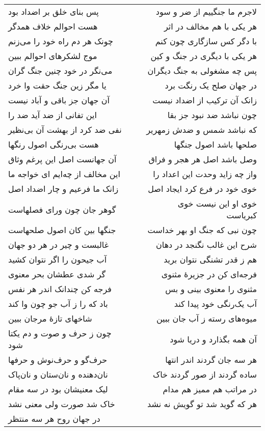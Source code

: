 \begin{center}
\begin{longtable}{l p{0.5cm} r}
پس بنای خلق بر اضداد بود
&&
لاجرم ما جنگییم از ضر و سود
\\
هست احوالم خلاف همدگر
&&
هر یکی با هم مخالف در اثر
\\
چونک هر دم راه خود را می‌زنم
&&
با دگر کس سازگاری چون کنم
\\
موج لشکرهای احوالم ببین
&&
هر یکی با دیگری در جنگ و کین
\\
می‌نگر در خود چنین جنگ گران
&&
پس چه مشغولی به جنگ دیگران
\\
یا مگر زین جنگ حقت وا خرد
&&
در جهان صلح یک رنگت برد
\\
آن جهان جز باقی و آباد نیست
&&
زانک آن ترکیب از اضداد نیست
\\
این تفانی از ضد آید ضد را
&&
چون نباشد ضد نبود جز بقا
\\
نفی ضد کرد از بهشت آن بی‌نظیر
&&
که نباشد شمس و ضدش زمهریر
\\
هست بی‌رنگی اصول رنگها
&&
صلحها باشد اصول جنگها
\\
آن جهانست اصل این پرغم وثاق
&&
وصل باشد اصل هر هجر و فراق
\\
این مخالف از چه‌ایم ای خواجه ما
&&
واز چه زاید وحدت این اعداد را
\\
زانک ما فرعیم و چار اضداد اصل
&&
خوی خود در فرع کرد ایجاد اصل
\\
گوهر جان چون ورای فصلهاست
&&
خوی او این نیست خوی کبریاست
\\
جنگها بین کان اصول صلحهاست
&&
چون نبی که جنگ او بهر خداست
\\
غالبست و چیر در هر دو جهان
&&
شرح این غالب نگنجد در دهان
\\
آب جیحون را اگر نتوان کشید
&&
هم ز قدر تشنگی نتوان برید
\\
گر شدی عطشان بحر معنوی
&&
فرجه‌ای کن در جزیرهٔ مثنوی
\\
فرجه کن چندانک اندر هر نفس
&&
مثنوی را معنوی بینی و بس
\\
باد که را ز آب جو چون وا کند
&&
آب یک‌رنگی خود پیدا کند
\\
شاخهای تازهٔ مرجان ببین
&&
میوه‌های رسته ز آب جان ببین
\\
چون ز حرف و صوت و دم یکتا شود
&&
آن همه بگذارد و دریا شود
\\
حرف‌گو و حرف‌نوش و حرفها
&&
هر سه جان گردند اندر انتها
\\
نان‌دهنده و نان‌ستان و نان‌پاک
&&
ساده گردند از صور گردند خاک
\\
لیک معنیشان بود در سه مقام
&&
در مراتب هم ممیز هم مدام
\\
خاک شد صورت ولی معنی نشد
&&
هر که گوید شد تو گویش نه نشد
\\
در جهان روح هر سه منتظر

\end{longtable}
\end{center}
